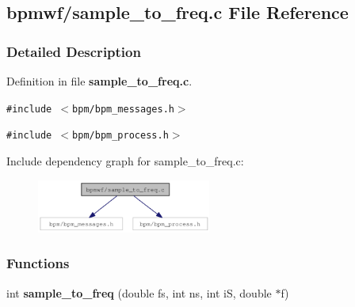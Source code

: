 \subsection{bpmwf/sample\_\-to\_\-freq.c File Reference}
\label{sample__to__freq_8c}


\subsubsection{Detailed Description}


Definition in file {\bf sample\_\-to\_\-freq.c}.

{\tt \#include $<$bpm/bpm\_\-messages.h$>$}\par
{\tt \#include $<$bpm/bpm\_\-process.h$>$}\par


Include dependency graph for sample\_\-to\_\-freq.c:\nopagebreak
\begin{figure}[H]
\begin{center}
\leavevmode
\includegraphics[width=162pt]{sample__to__freq_8c__incl}
\end{center}
\end{figure}
\subsubsection*{Functions}
\begin{CompactItemize}
\item 
int \textbf{sample\_\-to\_\-freq} (double fs, int ns, int iS, double $\ast$f)\label{group__wave_g6ce85ffae7051ec62a1f19ad23cbd6d5}

\end{CompactItemize}
